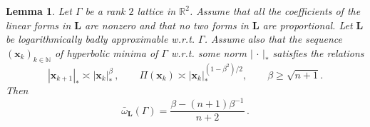 \documentclass[a4paper,12pt]{article}
\theoremstyle{definition}
\theoremstyle{remark}
\theoremstyle{plain}
\newtheorem{lemma}{Lemma}
\renewcommand{\vec}[1]{\mathbf{#1}}
\renewcommand{\geq}{\geqslant}
\newcommand{\R}{\mathbb{R}}
\newcommand{\N}{\mathbb{N}}
\newcommand{\Ga}{\Gamma}
\newcommand{\bL}{\mathbf{L}}
\begin{document}
\begin{lemma}\label{l:from_bar_omega_to_bar_omega_L}
  Let $\Ga$ be a rank $2$ lattice in $\R^2$. Assume that all the coefficients of the linear forms in $\bL$ are nonzero and that no two forms in $\bL$ are proportional. Let $\bL$ be logarithmically badly approximable w.r.t. $\Ga$. Assume also that the sequence $(\vec x_k)_{k\in\N}$ of hyperbolic minima of $\Ga$ w.r.t. some norm $|\,\cdot\,|_\ast$ satisfies the relations
  \begin{equation}\label{eq:beta_growth_of_successive_hyperbolic_minima}
    |\vec x_{k+1}|_\ast\asymp|\vec x_k|_\ast^\beta\,,
    \qquad
    \Pi(\vec x_k)\asymp|\vec x_k|_\ast^{(1-\beta^2)/2},
    \qquad
    \beta\geq\sqrt{n+1}.
  \end{equation}
  Then
  \[
    \bar\omega_\bL(\Ga)=
    \dfrac{\beta-(n+1)\beta^{-1}}{n+2}\,.
  \]
\end{lemma}
\end{document}
